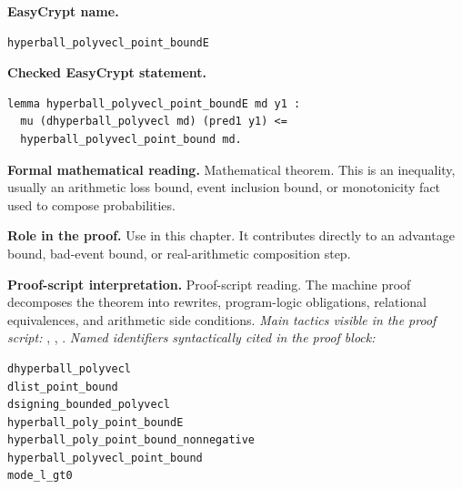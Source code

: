 \begin{formaltheorem}
\noindent\textbf{EasyCrypt name.}
\begin{lstlisting}[language=EasyCrypt,basicstyle=\ttfamily\scriptsize]
hyperball_polyvecl_point_boundE
\end{lstlisting}
\noindent\textbf{Checked EasyCrypt statement.}
\begin{lstlisting}[language=EasyCrypt,basicstyle=\ttfamily\scriptsize]
lemma hyperball_polyvecl_point_boundE md y1 :
  mu (dhyperball_polyvecl md) (pred1 y1) <=
  hyperball_polyvecl_point_bound md.
\end{lstlisting}
\noindent\textbf{Formal mathematical reading.}
Mathematical theorem. This is an inequality, usually an arithmetic loss bound, event inclusion bound, or monotonicity fact used to compose probabilities.

\noindent\textbf{Role in the proof.}
Use in this chapter. It contributes directly to an advantage bound, bad-event bound, or real-arithmetic composition step.

\noindent\textbf{Proof-script interpretation.}
Proof-script reading. The machine proof decomposes the theorem into rewrites, program-logic obligations, relational equivalences, and arithmetic side conditions.
\emph{Main tactics visible in the proof script:} , , .
\emph{Named identifiers syntactically cited in the proof block:}
\begin{lstlisting}[language=EasyCrypt,basicstyle=\ttfamily\scriptsize]
dhyperball_polyvecl
dlist_point_bound
dsigning_bounded_polyvecl
hyperball_poly_point_boundE
hyperball_poly_point_bound_nonnegative
hyperball_polyvecl_point_bound
mode_l_gt0
\end{lstlisting}

\end{formaltheorem}


